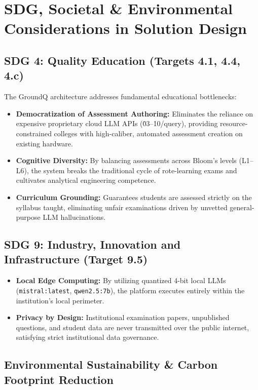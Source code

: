 \documentclass[12pt,a4paper]{report}
\begin{document}
\chapter{SDG, Societal \& Environmental Considerations in Solution Design}

\section{SDG 4: Quality Education (Targets 4.1, 4.4, 4.c)}

The GroundQ architecture addresses fundamental educational bottlenecks:
\begin{itemize}
    \item \textbf{Democratization of Assessment Authoring:} Eliminates the reliance on expensive proprietary cloud LLM APIs (\.03--\.10/query), providing resource-constrained colleges with high-caliber, automated assessment creation on existing hardware.
    \item \textbf{Cognitive Diversity:} By balancing assessments across Bloom's levels (L1--L6), the system breaks the traditional cycle of rote-learning exams and cultivates analytical engineering competence.
    \item \textbf{Curriculum Grounding:} Guarantees students are assessed strictly on the syllabus taught, eliminating unfair examinations driven by unvetted general-purpose LLM hallucinations.
\end{itemize}

\section{SDG 9: Industry, Innovation and Infrastructure (Target 9.5)}

\begin{itemize}
    \item \textbf{Local Edge Computing:} By utilizing quantized 4-bit local LLMs (\texttt{mistral:latest}, \texttt{qwen2.5:7b}), the platform executes entirely within the institution's local perimeter.
    \item \textbf{Privacy by Design:} Institutional examination papers, unpublished questions, and student data are never transmitted over the public internet, satisfying strict institutional data governance.
\end{itemize}

\section{Environmental Sustainability \& Carbon Footprint Reduction}
\end{document}
